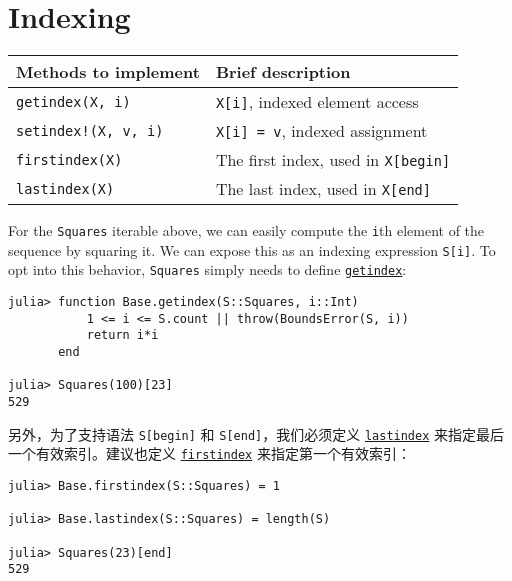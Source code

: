 \hypertarget{14566118977838625303}{}


\section{Indexing}




\begin{table}[h]

\begin{tabulary}{\linewidth}{|L|L|}
\hline
Methods to implement & Brief description \\
\hline
\texttt{getindex(X, i)} & \texttt{X[i]}, indexed element access \\
\hline
\texttt{setindex!(X, v, i)} & \texttt{X[i] = v}, indexed assignment \\
\hline
\texttt{firstindex(X)} & The first index, used in \texttt{X[begin]} \\
\hline
\texttt{lastindex(X)} & The last index, used in \texttt{X[end]} \\
\hline
\end{tabulary}

\end{table}



For the \texttt{Squares} iterable above, we can easily compute the \texttt{i}th element of the sequence by squaring it.  We can expose this as an indexing expression \texttt{S[i]}. To opt into this behavior, \texttt{Squares} simply needs to define \hyperlink{13720608614876840481}{\texttt{getindex}}:




\begin{verbatim}
julia> function Base.getindex(S::Squares, i::Int)
           1 <= i <= S.count || throw(BoundsError(S, i))
           return i*i
       end

julia> Squares(100)[23]
529
\end{verbatim}



另外，为了支持语法 \texttt{S[begin]} 和 \texttt{S[end]}，我们必须定义 \hyperlink{15780929618270241785}{\texttt{lastindex}} 来指定最后一个有效索引。建议也定义 \hyperlink{16943669671291374223}{\texttt{firstindex}} 来指定第一个有效索引：




\begin{verbatim}
julia> Base.firstindex(S::Squares) = 1

julia> Base.lastindex(S::Squares) = length(S)

julia> Squares(23)[end]
529
\end{verbatim}



